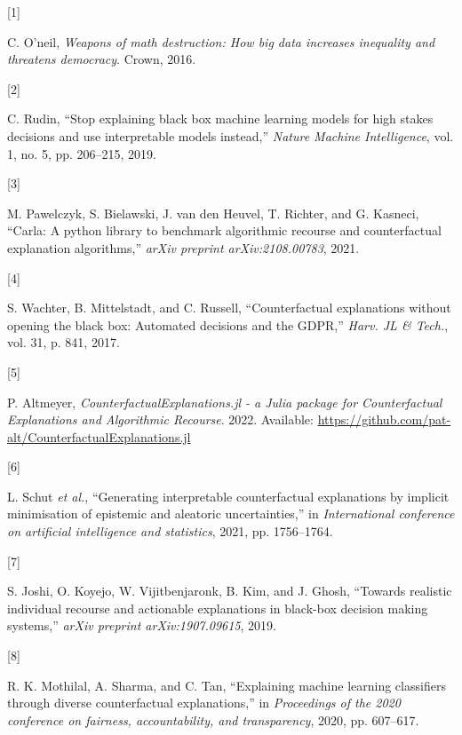 \documentclass[
  conference]{IEEEtran}
\newlength{\cslhangindent}
\newlength{\csllabelwidth}
\newlength{\cslentryspacingunit} %
\newenvironment{CSLReferences}[2] %
 {%
  \setlength{\parindent}{0pt}
  \ifodd #1
  \let\oldpar\par
  \def\par{\hangindent=\cslhangindent\oldpar}
  \fi
  \setlength{\parskip}{#2\cslentryspacingunit}
 }%
 {}
\newcommand{\CSLLeftMargin}[1]{\parbox[t]{\csllabelwidth}{#1}}
\newcommand{\CSLRightInline}[1]{\parbox[t]{\linewidth - \csllabelwidth}{#1}\break}
\begin{document}
\hypertarget{refs}{}
\begin{CSLReferences}{0}{0}
\leavevmode{}%
\CSLLeftMargin{{[}1{]} }%
\CSLRightInline{C. O'neil, \emph{Weapons of math destruction: How big
data increases inequality and threatens democracy}. Crown, 2016.}

\leavevmode{}%
\CSLLeftMargin{{[}2{]} }%
\CSLRightInline{C. Rudin, {``Stop explaining black box machine learning
models for high stakes decisions and use interpretable models
instead,''} \emph{Nature Machine Intelligence}, vol. 1, no. 5, pp.
206--215, 2019.}

\leavevmode{}%
\CSLLeftMargin{{[}3{]} }%
\CSLRightInline{M. Pawelczyk, S. Bielawski, J. van den Heuvel, T.
Richter, and G. Kasneci, {``Carla: A python library to benchmark
algorithmic recourse and counterfactual explanation algorithms,''}
\emph{arXiv preprint arXiv:2108.00783}, 2021.}

\leavevmode{}%
\CSLLeftMargin{{[}4{]} }%
\CSLRightInline{S. Wachter, B. Mittelstadt, and C. Russell,
{``Counterfactual explanations without opening the black box: Automated
decisions and the GDPR,''} \emph{Harv. JL \& Tech.}, vol. 31, p. 841,
2017.}

\leavevmode{}%
\CSLLeftMargin{{[}5{]} }%
\CSLRightInline{P. Altmeyer, \emph{{CounterfactualExplanations.jl - a
Julia package for Counterfactual Explanations and Algorithmic
Recourse}}. 2022. Available:
\url{https://github.com/pat-alt/CounterfactualExplanations.jl}}

\leavevmode{}%
\CSLLeftMargin{{[}6{]} }%
\CSLRightInline{L. Schut \emph{et al.}, {``Generating interpretable
counterfactual explanations by implicit minimisation of epistemic and
aleatoric uncertainties,''} in \emph{International conference on
artificial intelligence and statistics}, 2021, pp. 1756--1764.}

\leavevmode{}%
\CSLLeftMargin{{[}7{]} }%
\CSLRightInline{S. Joshi, O. Koyejo, W. Vijitbenjaronk, B. Kim, and J.
Ghosh, {``Towards realistic individual recourse and actionable
explanations in black-box decision making systems,''} \emph{arXiv
preprint arXiv:1907.09615}, 2019.}

\leavevmode{}%
\CSLLeftMargin{{[}8{]} }%
\CSLRightInline{R. K. Mothilal, A. Sharma, and C. Tan, {``Explaining
machine learning classifiers through diverse counterfactual
explanations,''} in \emph{Proceedings of the 2020 conference on
fairness, accountability, and transparency}, 2020, pp. 607--617.}


\end{CSLReferences}
\end{document}
